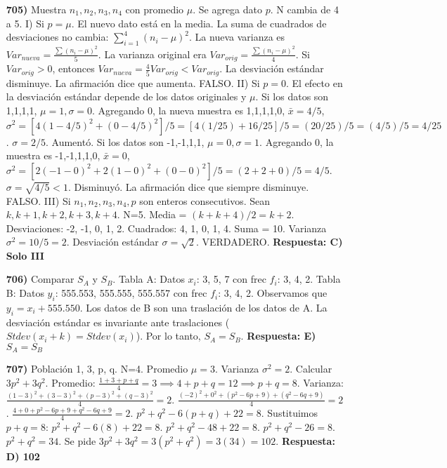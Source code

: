 \documentclass[12pt, a4paper]{article} %
\begin{document}
\begin{enumerate}
    \item[\bfseries 705)] Muestra $n_1, n_2, n_3, n_4$ con promedio $\mu$. Se agrega dato $p$. N cambia de 4 a 5.
    I) Si $p = \mu$. El nuevo dato está en la media. La suma de cuadrados de desviaciones no cambia: $\sum_{i=1}^4 (n_i-\mu)^2$. La nueva varianza es $Var_{nueva} = \frac{\sum (n_i-\mu)^2}{5}$. La varianza original era $Var_{orig} = \frac{\sum (n_i-\mu)^2}{4}$. Si $Var_{orig}>0$, entonces $Var_{nueva} = \frac{4}{5} Var_{orig} < Var_{orig}$. La desviación estándar disminuye. La afirmación dice que aumenta. FALSO.
    II) Si $p = 0$. El efecto en la desviación estándar depende de los datos originales y $\mu$. Si los datos son {1,1,1,1}, $\mu=1, \sigma=0$. Agregando 0, la nueva muestra es {1,1,1,1,0}, $\bar{x}=4/5$, $\sigma^2 = [4(1-4/5)^2 + (0-4/5)^2]/5 = [4(1/25)+16/25]/5 = (20/25)/5 = (4/5)/5=4/25$. $\sigma = 2/5$. Aumentó. Si los datos son {-1,-1,1,1}, $\mu=0, \sigma=1$. Agregando 0, la muestra es {-1,-1,1,1,0}, $\bar{x}=0$, $\sigma^2 = [2(-1-0)^2+2(1-0)^2+(0-0)^2]/5 = (2+2+0)/5 = 4/5$. $\sigma = \sqrt{4/5} < 1$. Disminuyó. La afirmación dice que siempre disminuye. FALSO.
    III) Si $n_1, n_2, n_3, n_4, p$ son enteros consecutivos. Sean $k, k+1, k+2, k+3, k+4$. N=5. Media = $(k+k+4)/2 = k+2$. Desviaciones: -2, -1, 0, 1, 2. Cuadrados: 4, 1, 0, 1, 4. Suma = 10. Varianza $\sigma^2 = 10/5 = 2$. Desviación estándar $\sigma = \sqrt{2}$. VERDADERO.
    \textbf{Respuesta: C) Solo III}

    \item[\bfseries 706)] Comparar $S_A$ y $S_B$.
    Tabla A: Datos $x_i$: 3, 5, 7 con frec $f_i$: 3, 4, 2.
    Tabla B: Datos $y_i$: 555.553, 555.555, 555.557 con frec $f_i$: 3, 4, 2.
    Observamos que $y_i = x_i + 555.550$. Los datos de B son una traslación de los datos de A.
    La desviación estándar es invariante ante traslaciones ($Stdev(x_i+k) = Stdev(x_i)$).
    Por lo tanto, $S_A = S_B$.
    \textbf{Respuesta: E) $S_A = S_B$}

    \item[\bfseries 707)] Población {1, 3, p, q}. N=4. Promedio $\mu=3$. Varianza $\sigma^2=2$. Calcular $3p^2+3q^2$.
    Promedio: $\frac{1+3+p+q}{4} = 3 \implies 4+p+q = 12 \implies p+q = 8$.
    Varianza: $\frac{(1-3)^2 + (3-3)^2 + (p-3)^2 + (q-3)^2}{4} = 2$.
    $\frac{(-2)^2 + 0^2 + (p^2-6p+9) + (q^2-6q+9)}{4} = 2$.
    $\frac{4 + 0 + p^2-6p+9 + q^2-6q+9}{4} = 2$.
    $p^2 + q^2 - 6(p+q) + 22 = 8$.
    Sustituimos $p+q=8$: $p^2 + q^2 - 6(8) + 22 = 8$.
    $p^2 + q^2 - 48 + 22 = 8$.
    $p^2 + q^2 - 26 = 8$.
    $p^2 + q^2 = 34$.
    Se pide $3p^2 + 3q^2 = 3(p^2+q^2) = 3(34) = 102$.
    \textbf{Respuesta: D) 102}


\end{enumerate}
\end{document}
